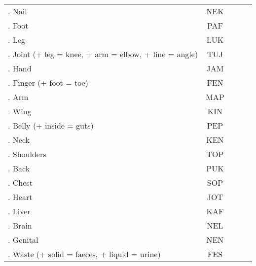 \begin{center}
{\begin{tabular}{|p{} | cx{0.2\textwidth}|cx{0.1\textwidth}|}
 
	\thelexi. Nail & NEK & \nek \\
	\thelexi. Foot & PAF & \paf \\
	\thelexi. Leg & LUK & \luk \\
	\thelexi. Joint (+ leg = knee, \newline+ arm = elbow, + line = angle) & TUJ & \tuj \\
	\thelexi. Hand & JAM & \jam \\
	\thelexi. Finger (+ foot = toe) & FEN & \fen \\
	\thelexi. Arm & MAP & \map \\
	\thelexi. Wing & KIN & \kin \\
	\thelexi. Belly (+ inside = guts) & PEP & \pep \\
	\thelexi. Neck & KEN & \ken \\
	\thelexi. Shoulders & TOP & \Atlantop \\
	\thelexi. Back & PUK & \puk \\
	\thelexi. Chest & SOP & \sop \\
	\thelexi. Heart & JOT & \Atlanjot \\
	\thelexi. Liver & KAF & \kaf \\
	\thelexi. Brain & NEL & \nel \\
	\thelexi. Genital & NEN & \nen \\
	\thelexi. Waste (+ solid = faeces, + liquid = urine) & FES & \fes \\
\hline
\end{tabular}
		}
	\end{center}

